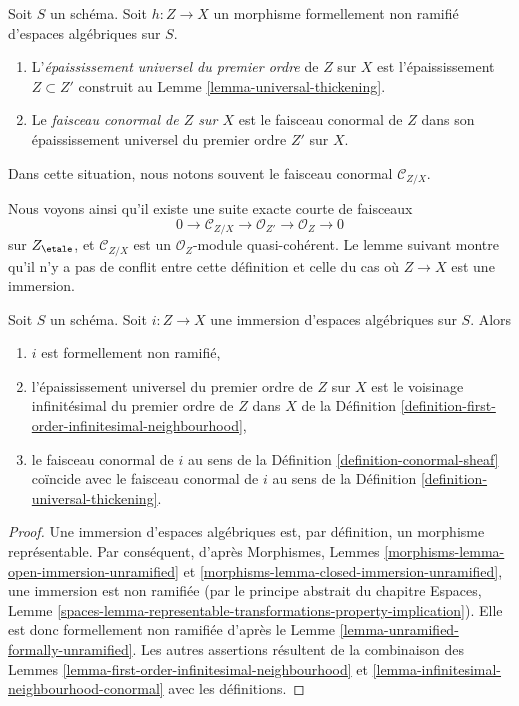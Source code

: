 \begin{definition}
\label{definition-universal-thickening}
Soit $S$ un schéma.
Soit $h : Z \to X$ un morphisme formellement non ramifié
d'espaces algébriques sur $S$.
\begin{enumerate}
\item L'{\it épaississement universel du premier ordre} de $Z$ sur $X$
est l'épaississement $Z \subset Z'$ construit au
Lemme \ref{lemma-universal-thickening}.
\item Le {\it faisceau conormal de $Z$ sur $X$} est le faisceau conormal
de $Z$ dans son épaississement universel du premier ordre $Z'$ sur $X$.
\end{enumerate}
Dans cette situation, nous notons souvent le faisceau conormal $\mathcal{C}_{Z/X}$.
\end{definition}

\noindent
Nous voyons ainsi qu'il existe une suite exacte courte de faisceaux
$$
0 \to \mathcal{C}_{Z/X} \to \mathcal{O}_{Z'} \to \mathcal{O}_Z \to 0
$$
sur $Z_\etale$, et $\mathcal{C}_{Z/X}$ est un $\mathcal{O}_Z$-module
quasi-cohérent. Le lemme suivant montre qu'il n'y a pas de
conflit entre cette définition et celle du cas où $Z \to X$
est une immersion.

\begin{lemma}
\label{lemma-immersion-universal-thickening}
Soit $S$ un schéma.
Soit $i : Z \to X$ une immersion d'espaces algébriques sur $S$. Alors
\begin{enumerate}
\item $i$ est formellement non ramifié,
\item l'épaississement universel du premier ordre de $Z$ sur $X$ est le voisinage
infinitésimal du premier ordre de $Z$ dans $X$ de la
Définition \ref{definition-first-order-infinitesimal-neighbourhood},
\item le faisceau conormal de $i$ au sens de la
Définition \ref{definition-conormal-sheaf}
coïncide avec le faisceau conormal de $i$ au sens de la
Définition \ref{definition-universal-thickening}.
\end{enumerate}
\end{lemma}

\begin{proof}
Une immersion d'espaces algébriques est, par définition, un morphisme représentable.
Par conséquent, d'après
Morphismes, Lemmes \ref{morphisms-lemma-open-immersion-unramified} et
\ref{morphisms-lemma-closed-immersion-unramified},
une immersion est non ramifiée (par le principe abstrait du chapitre
Espaces, Lemme
\ref{spaces-lemma-representable-transformations-property-implication}).
Elle est donc formellement non ramifiée d'après le
Lemme \ref{lemma-unramified-formally-unramified}.
Les autres assertions résultent de la combinaison des
Lemmes \ref{lemma-first-order-infinitesimal-neighbourhood} et
\ref{lemma-infinitesimal-neighbourhood-conormal}
avec les définitions.
\end{proof}

